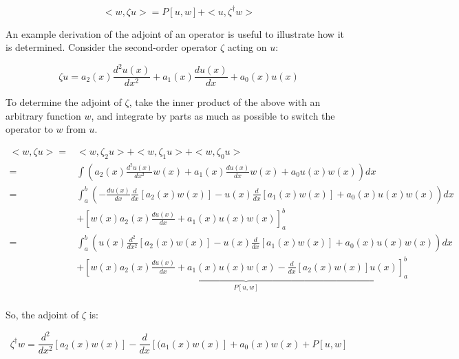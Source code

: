 \documentclass[10pt]{article}
\begin{document}
\begin{flushleft}
\begin{equation}
\label{eq:FormalAdjointDefinition}
<w, \zeta u> = P[u,w] + <u, \zeta^\dagger w>
\end{equation}

\begin{tcolorbox}[breakable]
An example derivation of the adjoint of an operator is useful to illustrate how it is determined. Consider the second-order operator \(\zeta\) acting on \(u\):

\begin{equation}
\zeta u=a_2(x)\frac{d^2u(x)}{dx^2}+a_1(x)\frac{du(x)}{dx}+a_0(x)u(x)
\end{equation}

To determine the adjoint of \(\zeta\), take the inner product of the above with an arbitrary function \(w\), and integrate by parts as much as possible to switch the operator to \(w\) from \(u\).

\begin{equation}
\begin{aligned}
<w,\zeta u> = & <w, \zeta_2 u> + <w, \zeta_1 u> + <w, \zeta_0 u>\\
= & \int \left(a_2(x)\frac{d^2u(x)}{dx^2}w(x)+a_1(x)\frac{du(x)}{dx}w(x)+a_0u(x)w(x)\right)dx\\
= & \int_a^b \left(-\frac{du(x)}{dx}\frac{d}{dx}\left\lbrack a_2(x)w(x)\right\rbrack -u(x)\frac{d}{dx}\left\lbrack a_1(x)w(x)\right\rbrack + a_0(x)u(x)w(x)\right) dx\\ 
& + \left\lbrack w(x)a_2(x)\frac{du(x)}{dx}+a_1(x)u(x)w(x)\right\rbrack_a^b\\
= & \int_a^b \left(u(x)\frac{d^2}{dx^2}\left\lbrack a_2(x)w(x)\right\rbrack-u(x)\frac{d}{dx}\left\lbrack a_1(x)w(x)\right\rbrack + a_0(x)u(x)w(x)\right)dx\\
& + \underbrace{\left\lbrack w(x)a_2(x)\frac{du(x)}{dx}+a_1(x)u(x)w(x)-\frac{d}{dx}\left\lbrack a_2(x)w(x)\right\rbrack u(x)\right\rbrack_a^b}_{P[u,w]}\\
\end{aligned}
\end{equation}

So, the adjoint of \(\zeta\) is:

\begin{equation}
\zeta^\dagger w= \frac{d^2}{dx^2}\left\lbrack a_2(x)w(x)\right\rbrack -\frac{d}{dx}\left\lbrack(a_1(x)w(x)\right\rbrack+a_0(x)w(x)+P[u,w]
\end{equation}


\end{tcolorbox}
\end{flushleft}
\end{document}
